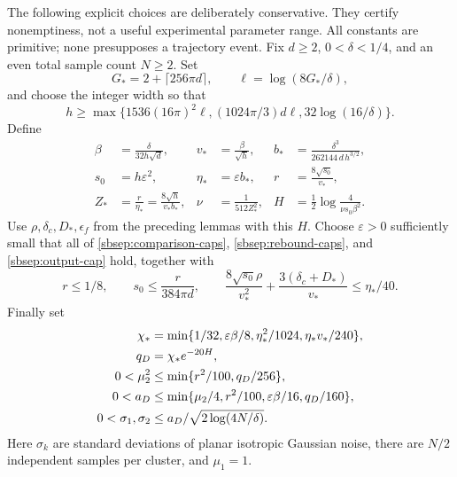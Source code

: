 \documentclass{article} %
\theoremstyle{plain}
\theoremstyle{definition}
\theoremstyle{remark}
\begin{document}
The following explicit choices are deliberately conservative. They certify
nonemptiness, not a useful experimental parameter range. All constants
are primitive; none presupposes a trajectory event.
Fix $d\ge2$, $0<\delta<1/4$, and an even total sample count $N\ge2$.
Set
\[
 G_*=2+\lceil256\pi d\rceil,\qquad \ell=\log(8G_*/\delta),
\]
and choose the integer width so that
\begin{equation}\label{sbsep:width}
 h\ge\max\{1536(16\pi)^2\ell,
           (1024\pi/3)d\ell,32\log(16/\delta)\}.
\end{equation}
Define
\begin{align*}
 \beta&=\frac{\delta}{32h\sqrt d},&
 v_*&=\frac\beta{\sqrt h},&
 b_*&=\frac{\delta^3}{262144\,d\,h^{3/2}},\\
 s_0&=h\varepsilon^2,& \eta_*&=\varepsilon b_*,&
 r&=\frac{8\sqrt{s_0}}{v_*},\\
 Z_*&=\frac r{\eta_*}=\frac{8\sqrt h}{v_*b_*},&
 \nu&=\frac1{512Z_*^2},&
 H&=\frac12\log\frac4{\nu s_0\beta^2}.
\end{align*}
Use $\rho,\delta_c,D_*,\epsilon_f$ from the preceding lemmas with
this $H$. Choose $\varepsilon>0$ sufficiently small that all of
\eqref{sbsep:comparison-caps}, \eqref{sbsep:rebound-caps}, and
\eqref{sbsep:output-cap} hold, together with
\begin{equation}\label{sbsep:remaining-caps}
 r\le1/8,\qquad s_0\le\frac r{384\pi d},\qquad
 \frac{8\sqrt{s_0}\rho}{v_*^2}
       +\frac{3(\delta_c+D_*)}{v_*}\le\eta_*/40.
\end{equation}
Finally set
\begin{align}
 \chi_*&=\min\{1/32,\varepsilon\beta/8,
                   \eta_*^2/1024,\eta_*v_*/240\},\notag\\
 q_D&=\chi_*e^{-20H},\label{sbsep:data-caps}\\
 0<\mu_2^2&\le\min\{r^2/100,q_D/256\},\notag\\
 0<a_D&\le\min\{\mu_2/4,r^2/100,
                           \varepsilon\beta/16,q_D/160\},\notag\\
 0<\sigma_1,\sigma_2&\le
                   a_D/\sqrt{2\log(4N/\delta)}.\notag
\end{align}
Here $\sigma_k$ are standard deviations of planar isotropic Gaussian
noise, there are $N/2$ independent samples per cluster, and $\mu_1=1$.
\end{document}
